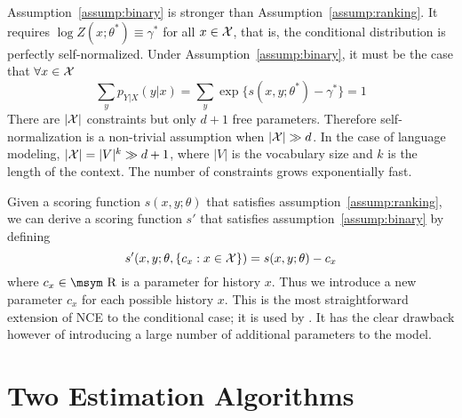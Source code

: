 \documentclass[11pt,a4paper]{article}
\newcommand{\reals}{\mbox{\msym R}}
\newcommand{\str}[3]{s(#1, #2; #3)}
\newcommand{\commentout}[1]{}
\begin{document}
\vspace{-2.5ex}

Assumption~\ref{assump:binary} is stronger than
Assumption~\ref{assump:ranking}. It requires $\log Z(x; \theta^*) \equiv \gamma^*$ for all $x\in{\cal X}$, that is, the conditional distribution is perfectly self-normalized. 
Under Assumption~\ref{assump:binary}, it must be the case that $\forall x\in {\cal X}$
\begin{equation*}
  \sum_y p_{Y|X}(y | x) = \sum_y \exp\{\str{x}{y}{\theta^*} - \gamma^*\}
 = 1
\end{equation*}
There are $|{\cal X}|$ constraints but only $d+1$ free parameters. 
Therefore self-normalization is a non-trivial assumption when $|{\cal X}| \gg d$.
In the case of language modeling, $|{\cal X}| = |V|^k \gg d+1$, where $|V|$ is the vocabulary size and $k$ is 
the length of the context. The number of constraints grows exponentially fast. 
\commentout{MJC:commented this out for now at least.
Finally we remark that, by taking expectation over $x$ on both sides of the equlity above, $\gamma^*$ is uniquely determined by $\theta^*$: 
\[
  \exp(\gamma^*) = \sum_x\sum_y p_X(x)\exp\{\str{x}{y}{\theta^*}\}.
\]
}

Given a scoring function $s(x, y; \theta)$ that satisfies
assumption~\ref{assump:ranking}, we can derive a scoring function
$s'$ that satisfies assumption~\ref{assump:binary} by defining
\[
s'(x, y; \theta, \{c_x: x \in {\cal X}\}) = s(x, y; \theta) - c_x
\]
where $c_x \in \reals$ is a parameter for history $x$. Thus we
introduce a new parameter $c_x$ for each possible history $x$. This is
the most straightforward extension of NCE to the conditional
case; it is used by \cite{mnih2012fast}. It has the clear
drawback however of introducing a large number of additional
parameters to the model.


\section{Two Estimation Algorithms}

\commentout{
This section first introduces the two negative sampling algorithms.
Section~\ref{sec:overview} then give an informal overview of consistency results for the two
algorithms (section~\ref{??} of this paper gives the full proof: we
include the informal discussion to give more intuition). Finally 
section~\ref{related}
discusses the use of the two algorithms in previous work.}
\end{document}
